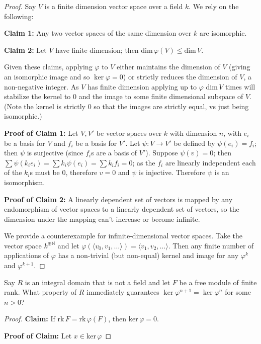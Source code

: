 \documentclass[12pt]{article}
\newcommand{\N}{\mathbb{N}}
\newcommand{\exercise}[1]{\noindent {\bf Exercise #1.}}
\newcommand{\kernel}[0]{\text{ker}\,}
\newcommand{\rank}[0]{\text{rk}\,}
\begin{document}
\begin{proof}
    Say $V$ is a finite dimension vector space over a field $k$.  We rely on the following:

    {\bf Claim 1:} Any two vector spaces of the same dimension over $k$ are isomorphic.

    {\bf Claim 2:} Let $V$ have finite dimension; then $\text{dim}\,\varphi(V) \le \text{dim}\,V$.

    Given these claims, applying $\varphi$ to $V$ either maintains the dimension of $V$ (giving an isomorphic image and so $\ker \varphi = 0$) or strictly reduces the dimension of $V$, a non-negative integer.  As $V$ has finite dimension applying up to $\varphi$ $\text{dim}\,V$ times will stabilize the kernel to 0 and the image to some finite dimensional subspace of $V$.  (Note the kernel is strictly 0 so that the images are strictly equal, vs just being isomorphic.)

    {\bf Proof of Claim 1:} Let $V, V'$ be vector spaces over $k$ with dimension $n$, with $e_i$ be a basis for $V$ and $f_i$ be a basis for $V'$.  Let $\psi : V \to V'$ be defined by $\psi(e_i) = f_i$; then $\psi$ is surjective (since $f_i$s are a basis of $V'$).  Suppose $\psi(v) = 0$; then $\sum \psi(k_i e_i) = \sum k_i\psi(e_i) = \sum k_i f_i = 0$; as the $f_i$ are linearly independent each of the $k_i$s must be 0, therefore $v = 0$ and $\psi$ is injective.  Therefore $\psi$ is an isomorphism.

    {\bf Proof of Claim 2:} A linearly dependent set of vectors is mapped by any endomorphism of vector spaces to a linearly dependent set of vectors, so the dimension under the mapping can't increase or become infinite.

    We provide a counterexample for infinite-dimensional vector spaces.  Take the vector space $k^{\oplus \N}$ and let $\varphi(\langle v_0, v_1, \ldots \rangle) = \langle v_1, v_2, \ldots \rangle$.  Then any finite number of applications of $\varphi$ has a non-trivial (but non-equal) kernel and image for any $\varphi^{k}$ and $\varphi^{k + 1}$.
\end{proof}

\exercise{1.15}
    Say $R$ is an integral domain that is not a field and let $F$ be a free module of finite rank.  What property of $R$ immediately guarantees $\ker \varphi^{n + 1} = \ker \varphi^{n}$ for some $n > 0$?

    \begin{proof}
        {\bf Claim:} If $\rank F = \rank \varphi(F)$, then $\kernel \varphi = 0$.

        {\bf Proof of Claim:} Let $x \in \kernel \varphi$
    \end{proof}
\end{document}
